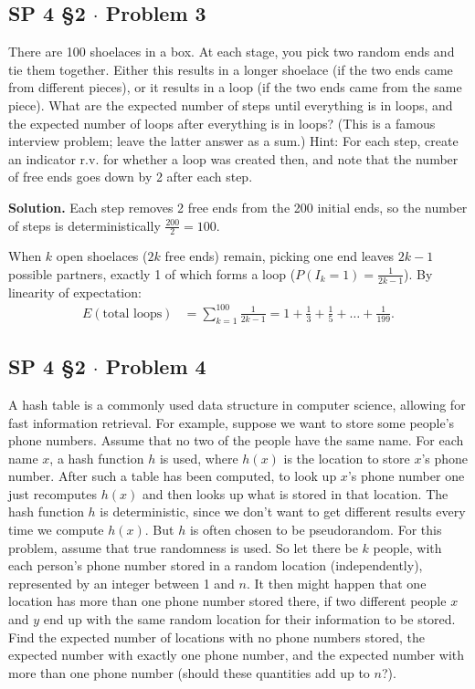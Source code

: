 \documentclass[11pt,a4paper]{article}
\begin{document}
\subsection{SP 4 \S2 $\cdot$ Problem 3}
\begin{tcolorbox}[title={SP 4 \S2 $\cdot$ Problem 3}]
There are 100 shoelaces in a box. At each stage, you pick two random ends and tie them together. Either this results in a longer shoelace (if the two ends came from different pieces), or it results in a loop (if the two ends came from the same piece). What are the expected number of steps until everything is in loops, and the expected number of loops after everything is in loops? (This is a famous interview problem; leave the latter answer as a sum.)
Hint: For each step, create an indicator r.v. for whether a loop was created then, and note that the number of free ends goes down by 2 after each step.
\end{tcolorbox}

\noindent \textbf{Solution.} Each step removes 2 free ends from the 200 initial ends, so the number of steps is deterministically $\frac{200}{2} = 100$. 

When $k$ open shoelaces ($2k$ free ends) remain, picking one end leaves $2k - 1$ possible partners, exactly 1 of which forms a loop ($P(I_k = 1) = \frac{1}{2k-1}$). By linearity of expectation:
\begin{align*}
E(\text{total loops}) &= \sum_{k=1}^{100} \frac{1}{2k - 1} = 1 + \frac{1}{3} + \frac{1}{5} + \dots + \frac{1}{199}.
\end{align*}

\vspace{10pt}
\subsection{SP 4 \S2 $\cdot$ Problem 4}
\begin{tcolorbox}[title={SP 4 \S2 $\cdot$ Problem 4}]
A hash table is a commonly used data structure in computer science, allowing for fast information retrieval. For example, suppose we want to store some people's phone numbers. Assume that no two of the people have the same name. For each name $x$, a hash function $h$ is used, where $h(x)$ is the location to store $x$'s phone number. After such a table has been computed, to look up $x$'s phone number one just recomputes $h(x)$ and then looks up what is stored in that location.
The hash function $h$ is deterministic, since we don't want to get different results every time we compute $h(x)$. But $h$ is often chosen to be pseudorandom. For this problem, assume that true randomness is used. So let there be $k$ people, with each person's phone number stored in a random location (independently), represented by an integer between 1 and $n$. It then might happen that one location has more than one phone number stored there, if two different people $x$ and $y$ end up with the same random location for their information to be stored.
Find the expected number of locations with no phone numbers stored, the expected number with exactly one phone number, and the expected number with more than one phone number (should these quantities add up to $n$?).
\end{tcolorbox}
\end{document}
